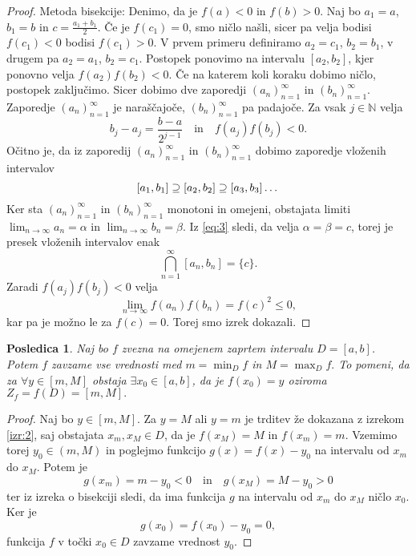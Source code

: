 \documentclass[10pt, a4paper]{article}
\newtheorem{posledica}[izr]{Posledica}
\newenvironment{noticeC}{%
  \tcolorbox[%
  notitle,
  empty,
  enhanced,  %
  breakable,
  coltext=black, 
  fontupper=\rmfamily,
  parbox=false,
  noparskip,
  sharp corners,
  boxrule=-1pt,  %
  frame hidden,
  left=7pt,  %
  right=7pt,
  top=5pt,
  bottom=5pt,
  before skip=2.5ex plus 2pt,
  after skip=2.5ex plus 2pt,
  overlay unbroken and last={%
  },
  ]}
{\endtcolorbox}
\newenvironment{dokaz}%
  {\begin{noticeC}\begin{proof}}%
  {\end{proof}\end{noticeC}}
\newcommand{\N}{\mathbb {N}}
\newcommand{\zap}[1]{(#1_n)_{n=1} ^{\infty}}
\newcommand{\limzap}[1]{\lim_{n \to \infty} {#1}}
\begin{document}
\begin{dokaz}
    Metoda bisekcije: Denimo, da je $f(a) < 0$ in $f(b) > 0$. Naj bo $a_1 = a$, $b_1 = b$ in $c = \frac{a_1 + b_1}{2}$. 
    Če je $f(c_1) = 0$, smo ničlo našli, sicer pa velja bodisi $f(c_1) < 0$ bodisi $f(c_1) > 0$.
    V prvem primeru definiramo $a_2 = c_1$, $b_2 = b_1$, v drugem pa $a_2 = a_1$, $b_2 = c_1$.
    Postopek ponovimo na intervalu $[a_2, b_2]$, kjer ponovno velja $f(a_2) f(b_2) < 0.$ Če na katerem koli koraku dobimo ničlo, postopek zaključimo. 
    Sicer dobimo dve zaporedji $\zap{a}$ in $\zap{b}$.
    Zaporedje $\zap{a}$ je naraščajoče, $\zap{b}$ pa padajoče. Za vsak $j \in \N$ velja
    \begin{equation}
        \label{eq:3}
        b_j - a_j = \frac{b-a}{2^{j-1}} \quad \text{in} \quad f(a_j) f(b_j) < 0.
    \end{equation}
    Očitno je, da iz zaporedij $\zap{a}$ in $\zap{b}$ dobimo zaporedje vloženih intervalov
    $$[a_1, b_1] \mathrel{{\reflectbox{$\subseteq$}}} [a_2, b_2] \mathrel{{\reflectbox{$\subseteq$}}} [a_3 , b_3] \dots$$
    Ker sta $\zap{a}$ in $\zap{b}$ monotoni in omejeni, obstajata limiti $\limzap{a_n} = \alpha$ in $\limzap{b_n} = \beta$.
    Iz \eqref{eq:3} sledi, da velja $\alpha = \beta = c$, torej je presek vloženih intervalov enak $$\bigcap_{n = 1} ^{\infty} [a_n, b_n] = \{c\}.$$
    Zaradi $f(a_j) f(b_j) < 0$ velja $$\limzap{f(a_n) f(b_n)} = f(c)^2 \leq 0,$$ kar pa je možno le za $f(c) = 0$. Torej smo izrek dokazali.
\end{dokaz}

\begin{posledica}
    Naj bo $f$ zvezna na omejenem zaprtem intervalu $D = [a,b]$. Potem $f$ zavzame vse vrednosti med $m = \min_D f$ in $M = \max_D f.$ 
    To pomeni, da za $\forall y \in [m, M]$ obstaja $\exists x_0 \in [a,b]$, da je $f(x_0) = y$ oziroma 
    $Z_f = f(D) = [m, M].$
\end{posledica}

\begin{dokaz}
    Naj bo $y \in [m, M]$. Za $y = M$ ali $y = m$ je trditev že dokazana z izrekom \ref{izr:2}, 
    saj obstajata $x_m, x_M \in D$, da je $f(x_M) = M$ in $f(x_m) = m$.
    Vzemimo torej $y_0 \in (m,M)$ in poglejmo funkcijo $g(x) = f(x) - y_0$ na intervalu od $x_m$ do $x_M$. 
    Potem je $$g(x_m) = m - y_0 < 0 \quad \text{in} \quad g(x_M) = M - y_0 > 0$$ ter iz izreka o bisekciji sledi, da ima funkcija $g$ na intervalu od $x_m$ do $x_M$ ničlo $x_0$.
    Ker je $$g(x_0) = f(x_0) - y_0 = 0,$$ funkcija $f$ v točki $x_0 \in D$ zavzame vrednost $y_0$.
\end{dokaz}
\end{document}

